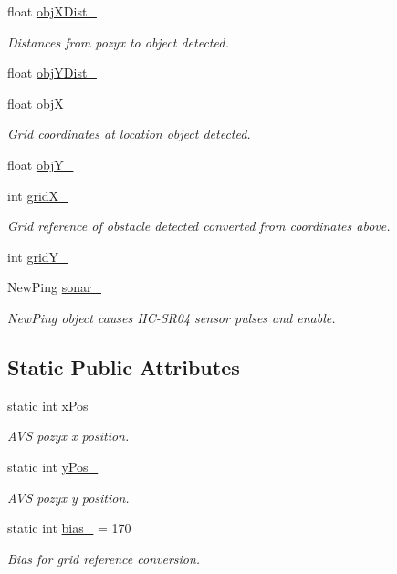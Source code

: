 \begin{DoxyCompactItemize}
float \mbox{\hyperlink{class_obstacle_sensor_a975d36873f7d0f9f2ddc2af247b56fc8}{obj\+X\+Dist\+\_\+}}
\begin{DoxyCompactList}\small\item\em Distances from pozyx to object detected. \end{DoxyCompactList}\item 
float \mbox{\hyperlink{class_obstacle_sensor_aeb1d3439a144640d73b07486dbfca10d}{obj\+Y\+Dist\+\_\+}}
\item 
float \mbox{\hyperlink{class_obstacle_sensor_a7ef55ced2aa190347a8a4fda017eec5c}{obj\+X\+\_\+}}
\begin{DoxyCompactList}\small\item\em Grid coordinates at location object detected. \end{DoxyCompactList}\item 
float \mbox{\hyperlink{class_obstacle_sensor_a8df25c3d11ae7b8e652bc8bb56fd6f64}{obj\+Y\+\_\+}}
\item 
int \mbox{\hyperlink{class_obstacle_sensor_a860064c48fae2c973d7e9b59868faff6}{grid\+X\+\_\+}}
\begin{DoxyCompactList}\small\item\em Grid reference of obstacle detected converted from coordinates above. \end{DoxyCompactList}\item 
int \mbox{\hyperlink{class_obstacle_sensor_a31c6b57b181045cf59227db2720da6f4}{grid\+Y\+\_\+}}
\item 
New\+Ping \mbox{\hyperlink{class_obstacle_sensor_a761a011e9009edaaee103d9bafceba14}{sonar\+\_\+}}
\begin{DoxyCompactList}\small\item\em New\+Ping object causes H\+C-\/\+S\+R04 sensor pulses and enable. \end{DoxyCompactList}\end{DoxyCompactItemize}
\subsection*{Static Public Attributes}
\begin{DoxyCompactItemize}
\item 
static int \mbox{\hyperlink{class_obstacle_sensor_aae4a515b967900605f9f4716112a8dad}{x\+Pos\+\_\+}}
\begin{DoxyCompactList}\small\item\em A\+VS pozyx x position. \end{DoxyCompactList}\item 
static int \mbox{\hyperlink{class_obstacle_sensor_aa18f61b87409e97fc63ef29c99f30b31}{y\+Pos\+\_\+}}
\begin{DoxyCompactList}\small\item\em A\+VS pozyx y position. \end{DoxyCompactList}\item 
static int \mbox{\hyperlink{class_obstacle_sensor_ad47c1a66f4d8eb28e239f3ae1c34f873}{bias\+\_\+}} = 170
\begin{DoxyCompactList}\small\item\em Bias for grid reference conversion. \end{DoxyCompactList}\end{DoxyCompactItemize}
